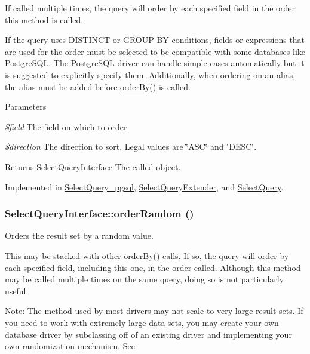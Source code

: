 If called multiple times, the query will order by each specified field in the order this method is called.

If the query uses DISTINCT or GROUP BY conditions, fields or expressions that are used for the order must be selected to be compatible with some databases like PostgreSQL. The PostgreSQL driver can handle simple cases automatically but it is suggested to explicitly specify them. Additionally, when ordering on an alias, the alias must be added before \hyperlink{interfaceSelectQueryInterface_a80eca1c7bc37fca0468b6526a3f303e7}{orderBy()} is called.


\begin{DoxyParams}{Parameters}
\item[{\em \$field}]The field on which to order. \item[{\em \$direction}]The direction to sort. Legal values are \char`\"{}ASC\char`\"{} and \char`\"{}DESC\char`\"{}. \end{DoxyParams}
\begin{DoxyReturn}{Returns}
\hyperlink{interfaceSelectQueryInterface}{SelectQueryInterface} The called object. 
\end{DoxyReturn}


Implemented in \hyperlink{classSelectQuery__pgsql_adb1134a3498b05b32a33787418d68f8c}{SelectQuery\_\-pgsql}, \hyperlink{classSelectQueryExtender_a7ed1e21116ca34f68a9d1c14e6c31096}{SelectQueryExtender}, and \hyperlink{classSelectQuery_a32ede93f2abfd7f8bc388d0c00512fae}{SelectQuery}.\hypertarget{interfaceSelectQueryInterface_a647a3152b4cee89205bb9d7274ffd019}{
\subsubsection[{orderRandom}]{\setlength{\rightskip}{0pt plus 5cm}SelectQueryInterface::orderRandom ()}}
\label{interfaceSelectQueryInterface_a647a3152b4cee89205bb9d7274ffd019}
Orders the result set by a random value.

This may be stacked with other \hyperlink{interfaceSelectQueryInterface_a80eca1c7bc37fca0468b6526a3f303e7}{orderBy()} calls. If so, the query will order by each specified field, including this one, in the order called. Although this method may be called multiple times on the same query, doing so is not particularly useful.

Note: The method used by most drivers may not scale to very large result sets. If you need to work with extremely large data sets, you may create your own database driver by subclassing off of an existing driver and implementing your own randomization mechanism. See

